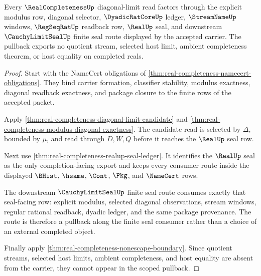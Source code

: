 \begin{theorem}
\label{thm:real-completeness-scoped-finite-seal-pullback}
Every $\RealCompletenessUp$ diagonal-limit read factors through the explicit modulus row, diagonal selector, $\DyadicRatCoreUp$ ledger, $\StreamNameUp$ windows, $\RegSeqRatUp$ readback row, $\RealUp$ seal, and downstream $\CauchyLimitSealUp$ finite seal route displayed by the accepted carrier. The pullback exports no quotient stream, selected host limit, ambient completeness theorem, or host equality on completed reals.
\end{theorem}
\begin{proof}
Start with the NameCert obligations of \autoref{thm:real-completeness-namecert-obligations}. They bind carrier formation, classifier stability, modulus exactness, diagonal readback exactness, and package closure to the finite rows of the accepted packet.

Apply \autoref{thm:real-completeness-diagonal-limit-candidate} and \autoref{thm:real-completeness-modulus-diagonal-exactness}. The candidate read is selected by $\Delta$, bounded by $\mu$, and read through $D,W,Q$ before it reaches the $\RealUp$ seal row.

Next use \autoref{thm:real-completeness-realup-seal-ledger}. It identifies the $\RealUp$ seal as the only completion-facing export and keeps every consumer route inside the displayed $\BHist$, $\hsame$, $\Cont$, $\Pkg$, and $\NameCert$ rows.

The downstream $\CauchyLimitSealUp$ finite seal route consumes exactly that seal-facing row: explicit modulus, selected diagonal observations, stream windows, regular rational readback, dyadic ledger, and the same package provenance. The route is therefore a pullback along the finite seal consumer rather than a choice of an external completed object.

Finally apply \autoref{thm:real-completeness-nonescape-boundary}. Since quotient streams, selected host limits, ambient completeness, and host equality are absent from the carrier, they cannot appear in the scoped pullback.
\end{proof}

